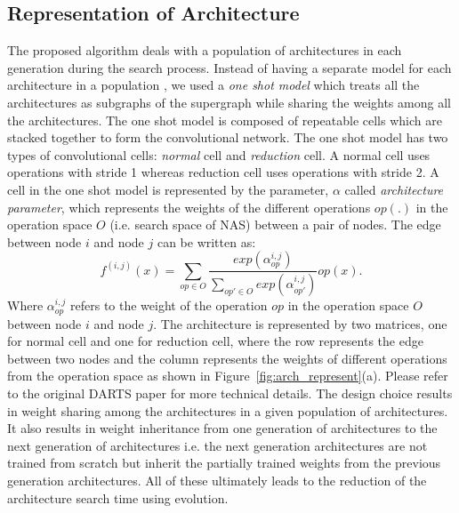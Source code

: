 \documentclass[final]{cvpr}
\begin{document}
\subsection{Representation of Architecture}
The proposed algorithm deals with a population of architectures in each generation during the 
search process. Instead of having a separate model for each architecture in a population
\cite{xie2017genetic}\cite{real2019regularized}, we used a \textit{one shot model} which
treats all the architectures as subgraphs of the supergraph while sharing the weights among
all the architectures. The one shot model is composed of repeatable cells which are stacked
together to form the convolutional network. The one shot model has two types of convolutional
cells: \textit{normal} cell and \textit{reduction} cell. A normal cell uses operations with
stride 1 whereas reduction cell uses operations with stride 2. A cell in the one shot model is
represented by the parameter, $\alpha$ called \textit{architecture parameter}, which
represents the weights of the different operations $op(.)$ in the operation space $O$ (i.e.
search space of NAS) between a pair of nodes. The edge between node $i$ and node
$j$ can be written as:
    \begin{equation}
       f^{(i,j)}(x) = \sum_{op \in O } 
            \frac{exp(\alpha^{i,j}_{op})}
                 {\sum_{op' \in O } exp(\alpha^{i,j}_{op'})} op(x).
    \end{equation}
Where $\alpha^{i,j}_{op}$ refers to the weight of the operation $op$ in the
operation space $O$ between node $i$ and node $j$. The architecture is represented by two 
matrices, one for normal cell and one for reduction cell, where the row represents the edge
between two nodes and the column represents the weights of different operations from the
operation space as shown in Figure~\ref{fig:arch_represent}(a). Please refer to the original
DARTS paper \cite{liu2018darts2} for more technical details.
The design choice results in weight sharing among the architectures in a given population of
architectures. It also results in weight inheritance from one generation of 
architectures to the next generation of architectures i.e. the next generation
architectures are not trained from scratch but inherit the partially trained weights
from the previous generation architectures. All of these ultimately
leads to the reduction of the architecture search time using evolution.
\end{document}
